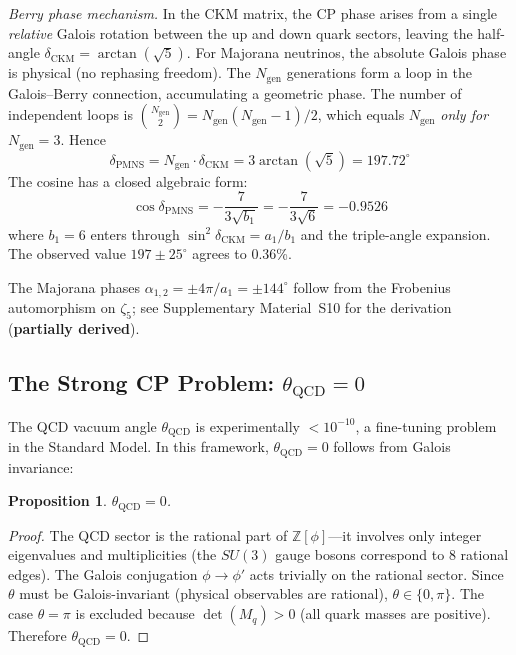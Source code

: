 \documentclass[12pt,a4paper]{article}
\newtheorem{proposition}{Proposition}
\theoremstyle{definition}
\begin{document}
\noindent\textit{Berry phase mechanism.}  In the CKM matrix, the CP phase arises from a single \emph{relative} Galois rotation between the up and down quark sectors, leaving the half-angle $\delta_{\text{CKM}} = \arctan(\sqrt{5})$.  For Majorana neutrinos, the absolute Galois phase is physical (no rephasing freedom).  The $N_{\text{gen}}$ generations form a loop in the Galois--Berry connection, accumulating a geometric phase.  The number of independent loops is $\binom{N_{\text{gen}}}{2} = N_{\text{gen}}(N_{\text{gen}}-1)/2$, which equals $N_{\text{gen}}$ \emph{only for} $N_{\text{gen}} = 3$.  Hence
\begin{equation}
\delta_{\text{PMNS}} = N_{\text{gen}} \cdot \delta_{\text{CKM}} = 3\arctan(\sqrt{5}) = 197.72^\circ
\end{equation}
The cosine has a closed algebraic form:
\begin{equation}
\cos\delta_{\text{PMNS}} = -\frac{7}{3\sqrt{b_1}} = -\frac{7}{3\sqrt{6}} = -0.9526
\end{equation}
where $b_1 = 6$ enters through $\sin^2\delta_{\text{CKM}} = a_1/b_1$ and the triple-angle expansion.  The observed value $197 \pm 25^\circ$ agrees to 0.36\%.

The Majorana phases $\alpha_{1,2} = \pm 4\pi/a_1 = \pm 144^\circ$ follow from the Frobenius automorphism on $\zeta_5$; see Supplementary Material~S10 for the derivation (\textbf{partially derived}).

\subsection{The Strong CP Problem: \texorpdfstring{$\theta_{\text{QCD}} = 0$}{theta\_QCD = 0}}

The QCD vacuum angle $\theta_{\text{QCD}}$ is experimentally $< 10^{-10}$, a fine-tuning problem in the Standard Model. In this framework, $\theta_{\text{QCD}} = 0$ follows from Galois invariance:

\begin{proposition}
$\theta_{\text{QCD}} = 0$.
\end{proposition}
\begin{proof}
The QCD sector is the rational part of $\mathbb{Z}[\phi]$---it involves only integer eigenvalues and multiplicities (the $SU(3)$ gauge bosons correspond to 8 rational edges). The Galois conjugation $\phi \to \phi'$ acts trivially on the rational sector. Since $\theta$ must be Galois-invariant (physical observables are rational), $\theta \in \{0, \pi\}$. The case $\theta = \pi$ is excluded because $\det(M_q) > 0$ (all quark masses are positive). Therefore $\theta_{\text{QCD}} = 0$.
\end{proof}
\end{document}
